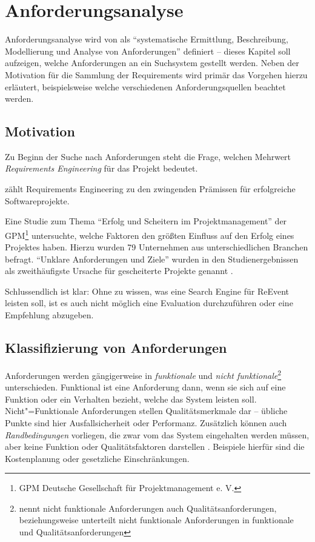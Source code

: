 \chapter{Anforderungsanalyse}
\label{ch:requirements}

Anforderungsanalyse wird von \cite[S. 598]{Balzert.2009} als \enquote{systematische Ermittlung, Beschreibung, Modellierung und Analyse von Anforderungen} definiert -- dieses Kapitel soll aufzeigen, welche Anforderungen an ein Suchsystem gestellt werden. Neben der Motivation für die Sammlung der Requirements wird primär das Vorgehen hierzu erläutert, beispielsweise welche verschiedenen Anforderungsquellen beachtet werden.

\section{Motivation}

Zu Beginn der Suche nach Anforderungen steht die Frage, welchen Mehrwert \emph{Requirements Engineering} für das Projekt bedeutet.

\cite[S.7]{Pohl.2008} zählt Requirements Engineering zu den zwingenden Prämissen für erfolgreiche Softwareprojekte.

Eine Studie zum Thema \enquote{Erfolg und Scheitern im Projektmanagement} der GPM\footnote{GPM Deutsche Gesellschaft für Projektmanagement e. V.} untersuchte, welche Faktoren den größten Einfluss auf den Erfolg eines Projektes haben. Hierzu wurden 79 Unternehmen aus unterschiedlichen Branchen befragt. \enquote{Unklare Anforderungen und Ziele} wurden in den Studienergebnissen als zweithäufigste Ursache für gescheiterte Projekte genannt \cite[S. 3, 8]{GPMDeutscheGesellschaftfurProjektmanagemente.V..2008}.

Schlussendlich ist klar: Ohne zu wissen, was eine Search Engine für ReEvent leisten soll, ist es auch nicht möglich eine Evaluation durchzuführen oder eine Empfehlung abzugeben.

\section{Klassifizierung von Anforderungen}
\label{sec:require.classes}
Anforderungen werden gängigerweise in \emph{funktionale} und \emph{nicht funktionale}\footnote{\cite[S. 16]{Pohl.2008} nennt nicht funktionale Anforderungen auch Qualitätsanforderungen, beziehungsweise unterteilt nicht funktionale Anforderungen in funktionale und Qualitätsanforderungen} unterschieden. Funktional ist eine Anforderung dann, wenn sie sich auf eine Funktion oder ein Verhalten bezieht, welche das System leisten soll. Nicht"=Funktionale Anforderungen stellen Qualitätsmerkmale dar -- übliche Punkte sind hier Ausfallsicherheit oder Performanz. Zusätzlich können auch \emph{Randbedingungen} vorliegen, die zwar vom das System eingehalten werden müssen, aber keine Funktion oder Qualitätsfaktoren darstellen \cite[S. 8f]{Pohl.2015}. Beispiele hierfür sind die Kostenplanung oder gesetzliche Einschränkungen.

